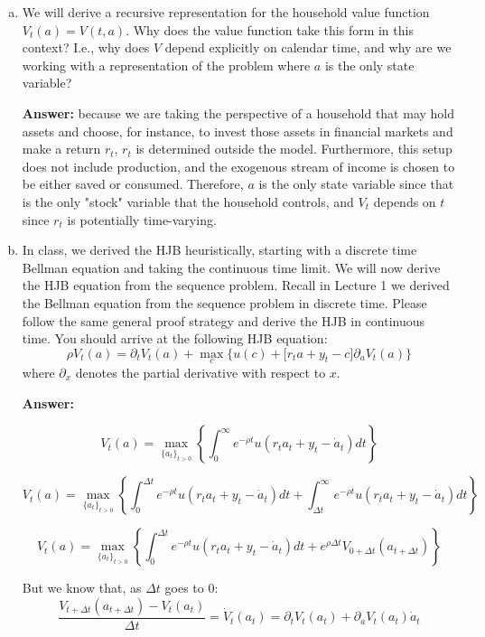 \documentclass[11pt]{extarticle}
\theoremstyle{plain}
\theoremstyle{definition}
\begin{document}
\vspace{2mm}
\begin{enumerate}[(a)] 
\item We will derive a recursive representation for the household value function $V_t(a) = V(t, a)$. Why does the value function take this form in this context? I.e., why does $V$ depend explicitly on calendar time, and why are we working with a representation of the problem where $a$ is the only state variable?

\textbf{Answer:} because we are taking the perspective of a household that may hold assets and choose, for instance, to invest those assets in financial markets and make a return $r_t$, $r_t$ is determined outside the model. Furthermore, this setup does not include production, and the exogenous stream of income is chosen to be either saved or consumed. Therefore, $a$ is the only state variable since that is the only "stock" variable that the household controls, and $V_t$ depends on $t$ since $r_t$ is potentially time-varying.

\item In class, we derived the HJB heuristically, starting with a discrete time Bellman equation and taking the continuous time limit. We will now derive the HJB equation from the sequence problem. Recall in Lecture 1 we derived the Bellman equation from the sequence problem in discrete time. Please follow the same general proof strategy and derive the HJB in continuous time. You should arrive at the following HJB equation: 
\begin{equation*}
	\rho V_t(a) = \partial_t V_t(a) + \max_c \bigg\{ u(c) + \Big[ r_t a + y_t - c \Big] \partial_a V_t(a) \bigg\}
\end{equation*}
where $\partial_x$ denotes the partial derivative with respect to $x$. 

\textbf{Answer:} 

\[
V_t(a) = 	\max_{\{a_t\}_{t>0}} \left\{\int_0^\infty e^{-\rho t} u(r_t a_t + y_t -\dot a_t) dt\right\}
\]

\[
V_t(a) = 	\max_{\{a_t\}_{t>0}} \left\{\int_0^{\Delta t} e^{-\rho t} u(r_t a_t + y_t -\dot a_t) dt + \int_{\Delta t}^\infty e^{-\rho t} u(r_t a_t + y_t -\dot a_t) dt\right\}
\]

\[
V_t(a) = 	\max_{\{a_t\}_{t>0}} \left\{\int_0^{\Delta t} e^{-\rho t} u(r_t a_t + y_t -\dot a_t) dt + e^{\rho \Delta t}V_{0+\Delta t}(a_{t+\Delta t})\right\}
\]

But we know that, as $\Delta t$ goes to 0:
$$\frac{V_{t+\Delta t}(a_{t+\Delta t})-V_t(a_t)}{\Delta t} = \dot V_t(a_t) = \partial_t V_t(a_t) + \partial_a V_t(a_t) \dot a_t$$


\end{enumerate}
\end{document}
